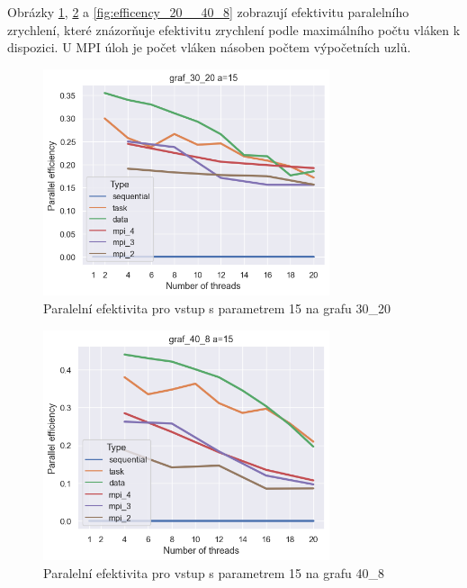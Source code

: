 \documentclass[epsf,epic,eepic,eepicemu]{article}\oddsidemargin=-5mm
\begin{document}
Obrázky \ref{fig:efficency_15__30_20}, \ref{fig:efficency_15__40_8} a \ref{fig:efficency_20__40_8} zobrazují efektivitu paralelního zrychlení, které znázorňuje efektivitu zrychlení podle maximálního počtu vláken k dispozici. U MPI úloh je počet vláken násoben počtem výpočetních uzlů.

\begin{figure}
\centering
\includegraphics[width=0.75\textwidth]{images/efficency_15__30_20}
\caption{Paralelní efektivita pro vstup s parametrem 15 na grafu 30\_20}
\label{fig:efficency_15__30_20}
\end{figure}
\begin{figure}
\centering
\includegraphics[width=0.75\textwidth]{images/efficency_15__40_8}
\caption{Paralelní efektivita pro vstup s parametrem 15 na grafu 40\_8}
\label{fig:efficency_15__40_8}
\end{figure}
\end{document}
